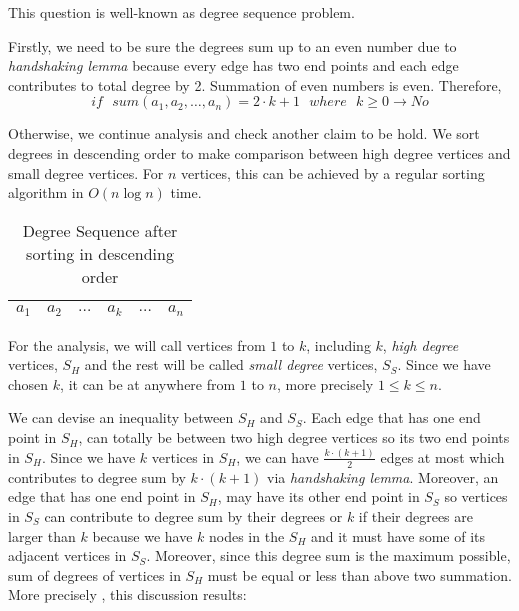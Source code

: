 This question is well-known as degree sequence problem.

Firstly, we need to be sure the degrees sum up to an even number due to \textit{handshaking lemma} because every edge has two end points and each edge contributes to total degree by 2. Summation of even numbers is even. Therefore, 
$$
  if\text{ }sum(a_1, a_2, \dots, a_n) = 2 \cdot k + 1\text{ }where\text{ }k \geq 0\rightarrow No
$$

Otherwise, we continue analysis and check another claim to be hold. We sort degrees in descending order to make comparison between high degree vertices and small degree vertices. For $n$ vertices, this can be achieved by a regular sorting algorithm in $O(n \log n)$ time.

\begin{table}[ht]
\begin{center}
\begin{tabular}{|*{10}{c|}}
  \hline  
  $a_1$ & $a_2$ & \multicolumn{3}{p{3cm}|}{ \hspace{1.2cm}$\dots$ } & $a_k$ & \multicolumn{3}{p{3cm}|}{ \hspace{1.2cm}$\dots$ } & $a_n$ \\
  \hline
\end{tabular}
\caption{Degree Sequence after sorting in descending order}
\end{center}
\end{table}

For the analysis, we will call vertices from $1$ to $k$, including $k$, \textit{high degree} vertices, $S_H$ and the rest will be called \textit{small degree} vertices, $S_S$. Since we have chosen $k$, it can be at anywhere from $1$ to $n$, more precisely $1 \leq k \leq n$.

We can devise an inequality between $S_H$ and $S_S$. Each edge that has one end point in $S_H$, can totally be between two high degree vertices so its two end points in $S_H$. Since we have $k$ vertices in $S_H$, we can have $\frac{k \cdot (k+1)}{2}$ edges at most which contributes to degree sum by $k \cdot (k+1)$ via \textit{handshaking lemma}. Moreover, an edge that has one end point in $S_H$, may have its other end point in $S_S$ so vertices in $S_S$ can contribute to degree sum by their degrees or $k$ if their degrees are larger than $k$ because we have $k$ nodes in the $S_H$ and it must have some of its adjacent vertices in $S_S$. Moreover, since this degree sum is the maximum possible, sum of degrees of vertices in $S_H$ must be equal or less than above two summation. More precisely , this discussion results:

